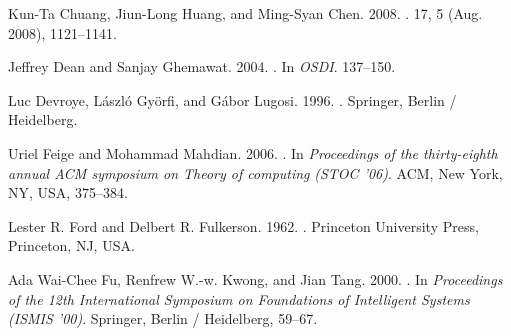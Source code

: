 \begin{thebibliography}{00}
{Kun-Ta Chuang}, {Jiun-Long Huang}, {and} {Ming-Syan Chen}. 2008.
\newblock {}.
 {17}, 5 (Aug. 2008), 1121--1141.


{Jeffrey Dean} {and} {Sanjay Ghemawat}. 2004.
\newblock {}. In {\em OSDI}. 137--150.
\newblock


{Luc Devroye}, {L{\'a}szl{\'o} Gy{\"o}rfi}, {and} {G\'{a}bor Lugosi}. 1996.
.
\newblock Springer, Berlin / Heidelberg.


{Uriel Feige} {and} {Mohammad Mahdian}. 2006.
\newblock {}. In {\em
  Proceedings of the thirty-eighth annual ACM symposium on Theory of computing}
  {\em (STOC '06)}. ACM, New York, NY, USA, 375--384.

{Lester R. Ford} {and} {Delbert R. Fulkerson}. 1962.
.
\newblock Princeton University Press, Princeton, NJ, USA.

{Ada Wai-Chee Fu}, {Renfrew W.-w. Kwong}, {and} {Jian Tang}. 2000.
\newblock {}. In {\em
  Proceedings of the 12th International Symposium on Foundations of Intelligent
  Systems} {\em (ISMIS '00)}. Springer, Berlin / Heidelberg, 59--67.



\end{thebibliography}
